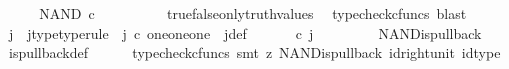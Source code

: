 \begin{isabellebody}
\ \ \isamarkupfalse%
\ \isamarkupfalse%
\ {\isachardoublequoteopen}NAND\ {\isasymcirc}\isactrlsub c\ {\isasymlangle}{\isasymt}{\isacharcomma}{\kern0pt}{\isasymt}{\isasymrangle}\ {\isacharequal}{\kern0pt}\ {\isasymt}{\isachardoublequoteclose}\isanewline
\ \ \ \ \isamarkupfalse%
\ \ true{\isacharunderscore}{\kern0pt}false{\isacharunderscore}{\kern0pt}only{\isacharunderscore}{\kern0pt}truth{\isacharunderscore}{\kern0pt}values\ \isamarkupfalse%
\ {\isacharparenleft}{\kern0pt}typecheck{\isacharunderscore}{\kern0pt}cfuncs{\isacharcomma}{\kern0pt}\ blast{\isacharparenright}{\kern0pt}\isanewline
\ \ \isamarkupfalse%
\ \isamarkupfalse%
\ j\ \ j{\isacharunderscore}{\kern0pt}type{\isacharbrackleft}{\kern0pt}type{\isacharunderscore}{\kern0pt}rule{\isacharbrackright}{\kern0pt}{\isacharcolon}{\kern0pt}\ \ {\isachardoublequoteopen}j\ {\isasymin}\isactrlsub c\ one{\isasymCoprod}{\isacharparenleft}{\kern0pt}one{\isasymCoprod}one{\isacharparenright}{\kern0pt}{\isachardoublequoteclose}\ \ j{\isacharunderscore}{\kern0pt}def{\isacharcolon}{\kern0pt}\ {\isachardoublequoteopen}{\isacharparenleft}{\kern0pt}{\isasymlangle}{\isasymf}{\isacharcomma}{\kern0pt}\ {\isasymf}{\isasymrangle}{\isasymamalg}\ {\isacharparenleft}{\kern0pt}{\isasymlangle}{\isasymt}{\isacharcomma}{\kern0pt}\ {\isasymf}{\isasymrangle}\ {\isasymamalg}{\isasymlangle}{\isasymf}{\isacharcomma}{\kern0pt}\ {\isasymt}{\isasymrangle}{\isacharparenright}{\kern0pt}{\isacharparenright}{\kern0pt}\ {\isasymcirc}\isactrlsub c\ j\ \ {\isacharequal}{\kern0pt}\ {\isasymlangle}{\isasymt}{\isacharcomma}{\kern0pt}{\isasymt}{\isasymrangle}{\isachardoublequoteclose}\isanewline
\ \ \ \ \isamarkupfalse%
\ NAND{\isacharunderscore}{\kern0pt}is{\isacharunderscore}{\kern0pt}pullback\ \isamarkupfalse%
\ is{\isacharunderscore}{\kern0pt}pullback{\isacharunderscore}{\kern0pt}def\isanewline
\ \ \ \ \isamarkupfalse%
\ {\isacharparenleft}{\kern0pt}typecheck{\isacharunderscore}{\kern0pt}cfuncs{\isacharcomma}{\kern0pt}\ smt\ {\isacharparenleft}{\kern0pt}z{}{\isacharparenright}{\kern0pt}\ NAND{\isacharunderscore}{\kern0pt}is{\isacharunderscore}{\kern0pt}pullback\ id{\isacharunderscore}{\kern0pt}right{\isacharunderscore}{\kern0pt}unit{}\ id{\isacharunderscore}{\kern0pt}type{\isacharparenright}{\kern0pt}\isanewline
\ \ \isamarkupfalse%
\ \isamarkupfalse%

\end{isabellebody}
